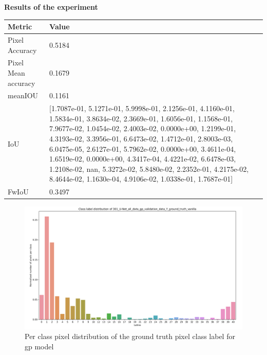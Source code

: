     { \bf Results of the experiment}
    
    \begin{center}
    	\begin{tabular}{ | l | p{12cm} |}
    		\hline
    		
    		\cellcolor{purple!30}Metric & \cellcolor{purple!30}Value \\ \hline
    		Pixel Accuracy & 0.5184 \\ \hline
    		Pixel Mean accuracy & 0.1679  \\ \hline
    		meanIOU & 0.1161 \\ \hline
    		IoU & [1.7087e-01, 5.1271e-01, 5.9998e-01, 2.1256e-01, 4.1160e-01, 1.5834e-01,
    		3.8634e-02, 2.3669e-01, 1.6056e-01, 1.1568e-01, 7.9677e-02, 1.0454e-02,
    		2.4003e-02, 0.0000e+00, 1.2199e-01, 4.3193e-02, 3.3956e-01, 6.6473e-02,
    		1.4712e-01, 2.8003e-03, 6.0475e-05, 2.6127e-01, 5.7962e-02, 0.0000e+00,
    		3.4611e-04, 1.6519e-02, 0.0000e+00, 4.3417e-04, 4.4221e-02, 6.6478e-03,
    		1.2108e-02,        nan, 5.3272e-02, 5.8480e-02, 2.2352e-01, 4.2175e-02,
    		8.4644e-02, 1.1630e-04, 4.9106e-02, 1.0338e-01, 1.7687e-01] \\ \hline
    		FwIoU & 0.3497 \\ \hline
    		\hline
    	\end{tabular}
    \end{center}
	
	\begin{figure}
		\centering
		\includegraphics[width=16cm]{images/Y_ground_truth_gp.png}
		\caption{Per class pixel distribution of the ground truth pixel class label for gp model}
		\label{fig:y_gt_gp}
	\end{figure}
	
